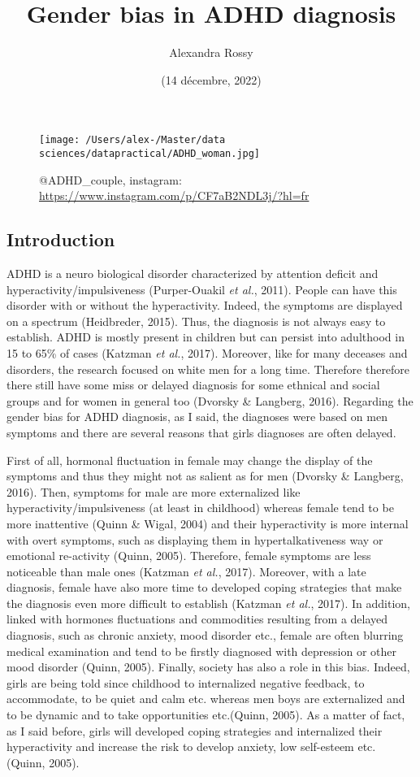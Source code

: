 \documentclass[
]{article}
\title{Gender bias in ADHD diagnosis}
\author{Alexandra Rossy}
\date{(14 décembre, 2022)}
\begin{document}
\maketitle

\begin{figure}
\centering
\texttt{[image: /Users/alex-/Master/data sciences/datapractical/ADHD\_woman.jpg]}
\caption{@ADHD\_couple, instagram:
\url{https://www.instagram.com/p/CF7aB2NDL3j/?hl=fr}}
\end{figure}

\hypertarget{introduction}{%
\subsection{Introduction}\label{introduction}}

ADHD is a neuro biological disorder characterized by attention deficit
and hyperactivity/impulsiveness (Purper-Ouakil \emph{et al.}, 2011).
People can have this disorder with or without the hyperactivity. Indeed,
the symptoms are displayed on a spectrum (Heidbreder, 2015). Thus, the
diagnosis is not always easy to establish. ADHD is mostly present in
children but can persist into adulthood in 15 to 65\% of cases (Katzman
\emph{et al.}, 2017). Moreover, like for many deceases and disorders,
the research focused on white men for a long time. Therefore therefore
there still have some miss or delayed diagnosis for some ethnical and
social groups and for women in general too (Dvorsky \& Langberg, 2016).
Regarding the gender bias for ADHD diagnosis, as I said, the diagnoses
were based on men symptoms and there are several reasons that girls
diagnoses are often delayed.

First of all, hormonal fluctuation in female may change the display of
the symptoms and thus they might not as salient as for men (Dvorsky \&
Langberg, 2016). Then, symptoms for male are more externalized like
hyperactivity/impulsiveness (at least in childhood) whereas female tend
to be more inattentive (Quinn \& Wigal, 2004) and their hyperactivity is
more internal with overt symptoms, such as displaying them in
hypertalkativeness way or emotional re-activity (Quinn, 2005).
Therefore, female symptoms are less noticeable than male ones (Katzman
\emph{et al.}, 2017). Moreover, with a late diagnosis, female have also
more time to developed coping strategies that make the diagnosis even
more difficult to establish (Katzman \emph{et al.}, 2017). In addition,
linked with hormones fluctuations and commodities resulting from a
delayed diagnosis, such as chronic anxiety, mood disorder etc., female
are often blurring medical examination and tend to be firstly diagnosed
with depression or other mood disorder (Quinn, 2005). Finally, society
has also a role in this bias. Indeed, girls are being told since
childhood to internalized negative feedback, to accommodate, to be quiet
and calm etc. whereas men boys are externalized and to be dynamic and to
take opportunities etc.(Quinn, 2005). As a matter of fact, as I said
before, girls will developed coping strategies and internalized their
hyperactivity and increase the risk to develop anxiety, low self-esteem
etc. (Quinn, 2005).
\end{document}
